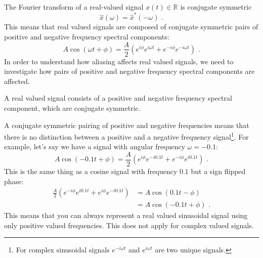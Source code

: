 The Fourier transform of a real-valued signal $x(t)\in\mathbb{R}$ is conjugate symmetric
\begin{equation}
  \hat{x}(\omega) = \hat{x}^*(-\omega)\,\,.
\end{equation}
This means that real valued signals are composed of conjugate
symmetric pairs of positive and negative frequency spectral
components:
\begin{equation}
A \cos(\omega t + \phi) = \frac{A}{2}(e^{i\phi}e^{i\omega t} + e^{-i\phi}e^{-i\omega t})\,\,.
\end{equation}
In order to understand how aliasing affects real valued signals, we
 need to investigate how pairs of positive and negative frequency spectral components are affected.
\begin{marginfigure}
\begin{center}
\end{center}
\caption{A real valued signal consists of a positive and negative frequency spectral component, which are conjugate symmetric.}
\end{marginfigure}
A conjugate symmetric pairing of positive and negative frequencies means that there is no distinction between a positive and a negative frequency 
signal\footnote{For complex sinusoidal signals $e^{-i \omega t}$ and $e^{i \omega t}$ are two unique signals.}. 
For example, let's say we have a signal with angular frequency $\omega = -0.1$:
\begin{equation}
A \cos(-0.1 t + \phi) = \frac{A}{2}(e^{i\phi}e^{-i0.1  t} + e^{-i\phi}e^{i0.1 t})\,\,.
\end{equation}
This is the same thing as a cosine signal with frequency $0.1$ but a sign flipped phase:
\begin{align}
  \frac{A}{2}(e^{-i\phi}e^{i 0.1 t} + e^{i\phi}e^{-i 0.1 t}) &= A \cos(0.1 t - \phi)\\
  &= A \cos(-0.1 t + \phi)\,\,.
\end{align}
This means that you can always represent a real valued sinusoidal signal using only positive valued frequencies. This does not apply for complex valued signals.

